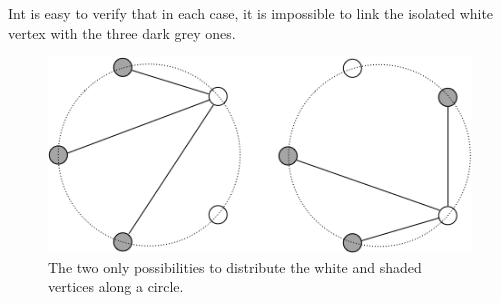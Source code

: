 \begin{itemize}
Int is easy to verify that in each case, it is impossible to link the isolated white vertex with the three dark grey ones.

\begin{figure}[h]
\begin{center}
        \includegraphics[scale=0.4]{FiguresGraph/outerplanarK3,2}
        \caption{The two only possibilities to distribute the white and shaded vertices along a circle.}
        \label{fig:outerplanarK32}
\end{center}
\end{figure}


\end{itemize}


